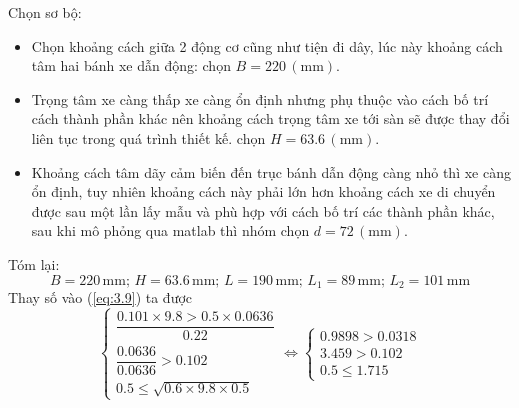             \newpage
            Chọn sơ bộ:
            \begin{itemize}
                \item Chọn khoảng cách giữa 2 động cơ cũng như tiện đi dây, lúc này khoảng cách tâm hai bánh xe dẫn động: chọn $B = 220 \,(\mathrm{mm})$.
                \item Trọng tâm xe càng thấp xe càng ổn định nhưng phụ thuộc vào cách bố trí cách thành phần khác nên khoảng cách trọng tâm xe tới sàn sẽ được thay đổi liên tục trong quá trình thiết kế. chọn $H = 63.6 \,(\mathrm{mm})$.
                \item Khoảng cách tâm dãy cảm biến đến trục bánh dẫn động càng nhỏ thì xe càng ổn định, tuy nhiên khoảng cách này phải lớn hơn khoảng cách xe di chuyển được sau một lần lấy mẫu và phù hợp với cách bố trí các thành phần khác, sau khi mô phỏng qua matlab thì nhóm chọn $d = 72 \,(\mathrm{mm})$.
            \end{itemize}
            \hspace*{0.6cm}Tóm lại:
            \begin{equation*}
                B = 220 \,\mathrm{mm}; \, H = 63.6 \,\mathrm{mm}; \, L = 190 \,\mathrm{mm}; \, L_1 = 89 \,\mathrm{mm}; \, L_2 = 101 \,\mathrm{mm}
            \end{equation*}
            \hspace*{0.6cm}Thay số vào (\ref{eq:3.9}) ta được
            \begin{equation*}
                \begin{cases}
                \dfrac{0.101 \times 9.8 > 0.5 \times 0.0636}{0.22} \\
                \dfrac{0.0636}{0.0636} > 0.102 \\
                0.5 \leq \sqrt{0.6 \times 9.8 \times 0.5}
                \end{cases}
                \Leftrightarrow
                \begin{cases}
                0.9898 > 0.0318 \\
                3.459 > 0.102 \\
                0.5 \leq 1.715
                \end{cases}
            \end{equation*}           

